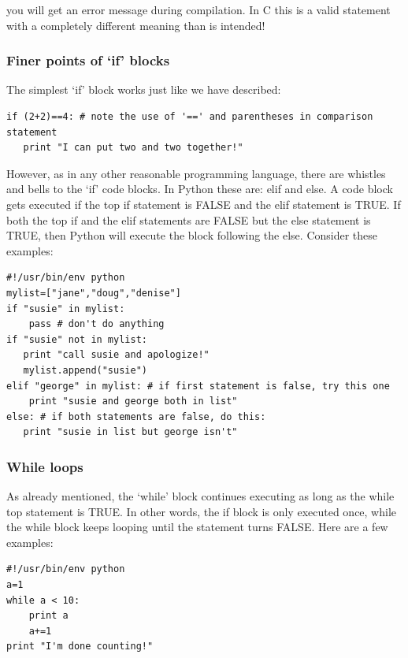 \documentclass[11pt]{book}
\begin{document}
{{{{\noindent you will get an error message during compilation.  In C this
is a valid statement with a completely different meaning
than is intended!


\subsubsection{Finer points of `if' blocks}

The simplest `if' block works just like we have described:
{ \color{blue} \begin{verbatim}
if (2+2)==4: # note the use of '==' and parentheses in comparison statement
   print "I can put two and two together!"
\end{verbatim}}

However, as in any other reasonable programming language, there are whistles and bells to the `if' code blocks.  In Python these are:  {\color{blue}elif} and {\color{blue}else}.
A code block gets executed if the top {\color{blue}if} statement is FALSE and the  {\color{blue}elif}  statement is TRUE.  If both the top {\color{blue}if} and the {\color{blue}elif}  statements are FALSE but the  {\color{blue}else}  statement is TRUE, then Python will execute the block following the  {\color{blue}else}.  Consider these examples:

{ \color{blue} \begin{verbatim}
#!/usr/bin/env python
mylist=["jane","doug","denise"]
if "susie" in mylist:
    pass # don't do anything
if "susie" not in mylist:
   print "call susie and apologize!"
   mylist.append("susie")
elif "george" in mylist: # if first statement is false, try this one
    print "susie and george both in list"
else: # if both statements are false, do this:
   print "susie in list but george isn't"
\end{verbatim}}

\subsubsection{While loops}

As already mentioned, the `while' block  continues executing as long as the {\color{blue}while}  top statement is TRUE.  In other words, the if block is only executed once, while the {\color{blue}while}  block keeps looping until the statement turns FALSE.    Here are a few examples:


{ \color{blue} \begin{verbatim}
#!/usr/bin/env python
a=1
while a < 10:
    print a
    a+=1
print "I'm done counting!"
\end{verbatim}}

}}}}
\end{document}
